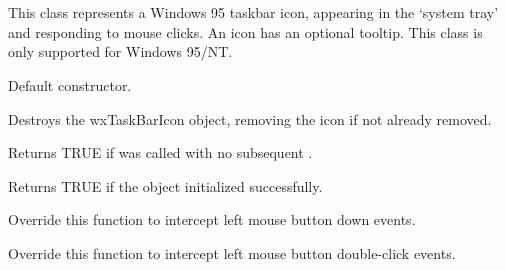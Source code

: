 \section{}\label{wxtaskbaricon}

This class represents a Windows 95 taskbar icon, appearing in the `system tray' and responding to
mouse clicks. An icon has an optional tooltip. This class is only supported for Windows 95/NT.




\label{wxtaskbariconconstr}


Default constructor.



Destroys the wxTaskBarIcon object, removing the icon if not already removed.

\label{wxtaskbariconisiconinstalled}


Returns TRUE if  was called with no subsequent .

\label{wxtaskbariconisok}


Returns TRUE if the object initialized successfully.

\label{wxtaskbaricononlbuttondown}


Override this function to intercept left mouse button down events.

\label{wxtaskbaricononlbuttondclick}


Override this function to intercept left mouse button double-click events.

\label{wxtaskbaricononlbuttonup}

